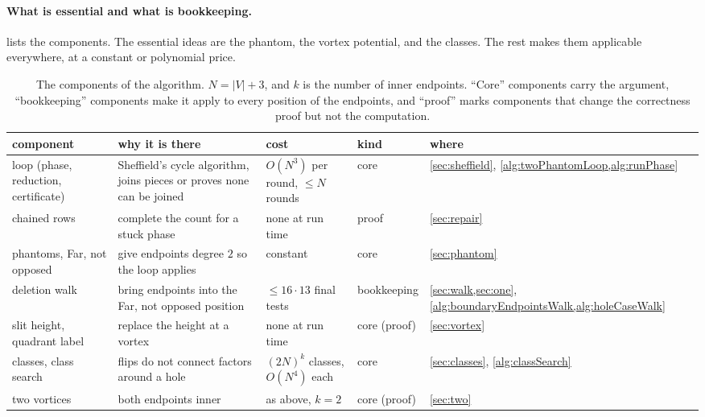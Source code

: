 \documentclass[11pt]{article}
\theoremstyle{plain}
\theoremstyle{definition}
\theoremstyle{remark}
\begin{document}
\paragraph{What is essential and what is bookkeeping.}
 lists the components.
The essential ideas are the phantom, the vortex potential, and the classes.
The rest makes them applicable everywhere, at a constant or polynomial price.

\begin{table}[t]
\centering
\small
\begin{tabular}{@{}>{\raggedright\arraybackslash}p{2.6cm}>{\raggedright\arraybackslash}p{4.4cm}>{\raggedright\arraybackslash}p{2.6cm}>{\raggedright\arraybackslash}p{1.9cm}>{\raggedright\arraybackslash}p{2.2cm}@{}}
\toprule
component & why it is there & cost & kind & where \\
\midrule
loop (phase, reduction, certificate) & Sheffield's cycle algorithm, joins pieces or proves none can be joined & $O(N^3)$ per round, $\le N$ rounds & core & \cref{sec:sheffield}, \cref{alg:twoPhantomLoop,alg:runPhase} \\
chained rows & complete the count for a stuck phase & none at run time & proof & \cref{sec:repair} \\
phantoms, Far, not opposed & give endpoints degree $2$ so the loop applies & constant & core & \cref{sec:phantom} \\
deletion walk & bring endpoints into the Far, not opposed position & $\le 16\cdot13$ final tests & bookkeeping & \cref{sec:walk,sec:one}, \cref{alg:boundaryEndpointsWalk,alg:holeCaseWalk} \\
slit height, quadrant label & replace the height at a vortex & none at run time & core (proof) & \cref{sec:vortex} \\
classes, class search & flips do not connect factors around a hole & $(2N)^k$ classes, $O(N^4)$ each & core & \cref{sec:classes}, \cref{alg:classSearch} \\
two vortices & both endpoints inner & as above, $k=2$ & core (proof) & \cref{sec:two} \\
\bottomrule
\end{tabular}
\caption{The components of the algorithm.
$N=|V|+3$, and $k$ is the number of inner endpoints.
``Core'' components carry the argument, ``bookkeeping'' components make it apply to every position
of the endpoints, and ``proof'' marks components that change the correctness proof but not the
computation.}
\label{tab:components}
\end{table}
\end{document}
